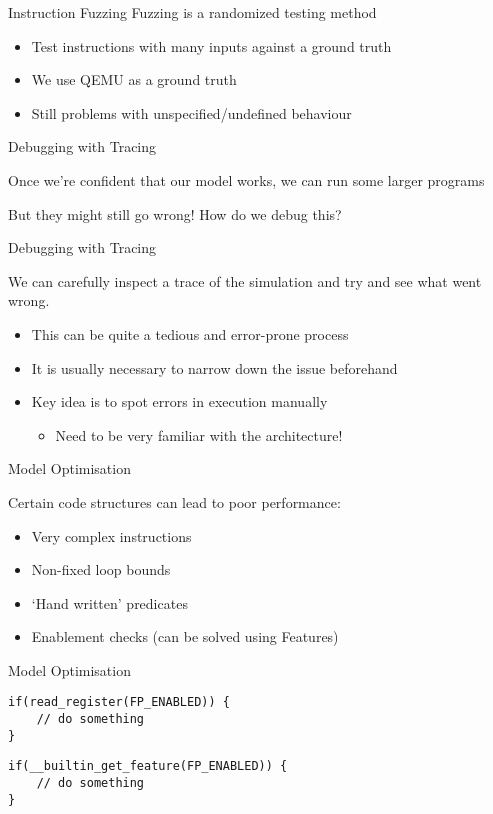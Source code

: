 \begin{frame}{Instruction Fuzzing}
Fuzzing is a randomized testing method

\begin{itemize}
\item<2-> Test instructions with many inputs against a ground truth
\item<3-> We use QEMU as a ground truth
\item<4-> \alert{Still problems with unspecified/undefined behaviour}
\end{itemize}



\end{frame}

\begin{frame}{Debugging with Tracing}

Once we're confident that our model works, we can run some larger programs

\pause

\alert{But they might still go wrong! How do we debug this?}

\end{frame}


\begin{frame}{Debugging with Tracing}

We can carefully inspect a trace of the simulation and try and see
what went wrong.
\begin{itemize}
\item This can be quite a tedious and error-prone process
\item It is usually necessary to narrow down the issue beforehand
\item Key idea is to spot errors in execution manually
\begin{itemize}
\item Need to be very familiar with the architecture!
\end{itemize}
\end{itemize}

\end{frame}

\begin{frame}{Model Optimisation}

Certain code structures can lead to poor performance:
\begin{itemize}
\item Very complex instructions
\item Non-fixed loop bounds
\item `Hand written' predicates
\item Enablement checks (can be solved using Features)
\end{itemize} 

\end{frame}

\begin{frame}[fragile]{Model Optimisation}
\begin{lstlisting}
if(read_register(FP_ENABLED)) {
	// do something
}
\end{lstlisting}

\begin{lstlisting}
if(__builtin_get_feature(FP_ENABLED)) {
	// do something
}
\end{lstlisting}

\end{frame}

